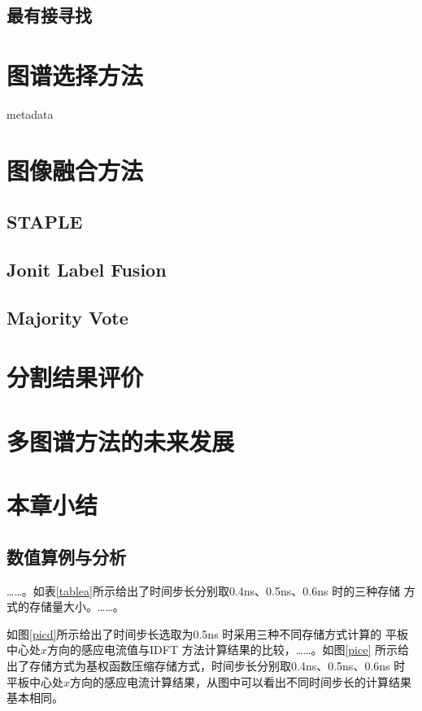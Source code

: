 \subsection{最有接寻找}

\section{图谱选择方法}
metadata\par

\section{图像融合方法}
\subsection{STAPLE}
\subsection{Jonit Label Fusion}
\subsection{Majority Vote}

\section{分割结果评价}

\section{多图谱方法的未来发展}

\section{本章小结}


\subsection{数值算例与分析}
……。如表\ref{tablea}所示给出了时间步长分别取0.4ns、0.5ns、0.6ns 时的三种存储
方式的存储量大小。……。

如图\ref{picd}所示给出了时间步长选取为0.5ns 时采用三种不同存储方式计算的
平板中心处$x$方向的感应电流值与IDFT 方法计算结果的比较，……。如图\ref{pice}
所示给出了存储方式为基权函数压缩存储方式，时间步长分别取0.4ns、0.5ns、0.6ns
时平板中心处$x$方向的感应电流计算结果，从图中可以看出不同时间步长的计算结果基本相同。

